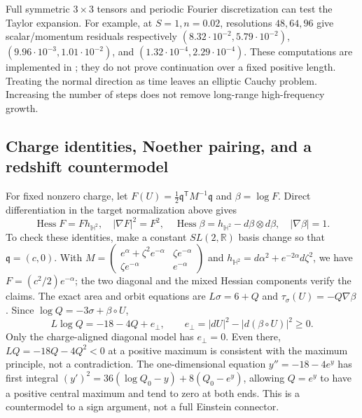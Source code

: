 \documentclass[a4paper,11pt]{article}
\numberwithin{equation}{section}
\theoremstyle{definition}
\newcommand{\R}{\mathbb R}
\begin{document}
Full symmetric $3\times3$ tensors and periodic Fourier discretization can test the Taylor expansion.
For example, at $S=1,n=0.02$, resolutions $48,64,96$ give scalar/momentum residuals respectively
$(8.32\cdot10^{-2},5.79\cdot10^{-2})$,
$(9.96\cdot10^{-3},1.01\cdot10^{-2})$, and
$(1.32\cdot10^{-4},2.29\cdot10^{-4})$.
These computations are implemented in ; they do not prove continuation over a fixed positive length.
Treating the normal direction as time leaves an elliptic Cauchy problem. Increasing the number of steps does not remove long-range high-frequency growth.

\subsection{Charge identities, Noether pairing, and a redshift countermodel}
For fixed nonzero charge, let
$F(U)=\frac12\mathfrak q^{\mathsf T}M^{-1}\mathfrak q$ and $\beta=\log F$.
Direct differentiation in the target normalization above gives
\[
 \operatorname{Hess}F=Fh_{\mathbb H^2},\quad|\nabla F|^2=F^2,
 \quad\operatorname{Hess}\beta=h_{\mathbb H^2}-d\beta\otimes d\beta,
 \quad|\nabla\beta|=1.
\]
To check these identities, make a constant $SL(2,\R)$ basis change so that $\mathfrak q=(c,0)$.
With
$M=\left(\begin{smallmatrix}
e^\alpha+\zeta^2e^{-\alpha}&\zeta e^{-\alpha}\\
\zeta e^{-\alpha}&e^{-\alpha}
\end{smallmatrix}\right)$ and
$h_{\mathbb H^2}=d\alpha^2+e^{-2\alpha}d\zeta^2$,
we have $F=(c^2/2)e^{-\alpha}$; the two diagonal and the mixed Hessian components verify the claims.
The exact area and orbit equations are $L\sigma=6+Q$ and $\tau_\sigma(U)=-Q\nabla\beta$.
Since $\log Q=-3\sigma+\beta\circ U$,
\begin{equation}\label{eq:charged-logQ}
 L\log Q=-18-4Q+e_\perp,
 \qquad e_\perp=|dU|^2-|d(\beta\circ U)|^2\ge0.
\end{equation}
Only the charge-aligned diagonal model has $e_\perp=0$.
Even there, $LQ=-18Q-4Q^2<0$ at a positive maximum is consistent with the maximum principle, not a contradiction.
The one-dimensional equation $y''=-18-4e^y$ has first integral
$(y')^2=36(\log Q_0-y)+8(Q_0-e^y)$,
allowing $Q=e^y$ to have a positive central maximum and tend to zero at both ends.
This is a countermodel to a sign argument, not a full Einstein connector.
\end{document}
